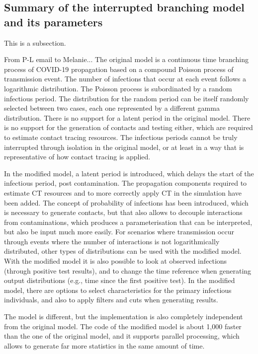 \documentclass[sr]{drdc-report}
\begin{document}
\subsection{Summary of the interrupted branching model and its parameters}
This is a subsection.

From P-L email to Melanie...
The original model is a continuous time branching process of COVID-19 propagation based on a compound Poisson process of transmission event. The number of infections that occur at each event follows a logarithmic distribution. The Poisson process is subordinated by a random infectious period. The distribution for the random period can be itself randomly selected between two cases, each one represented by a different gamma distribution. There is no support for a latent period in the original model. There is no support for the generation of contacts and testing either, which are required to estimate contact tracing resources. The infectious periods cannot be truly interrupted through isolation in the original model, or at least in a way that is representative of how contact tracing is applied.

In the modified model, a latent period is introduced, which delays the start of the infectious period, post contamination. The propagation components required to estimate CT resources and to more correctly apply CT in the simulation have been added. The concept of probability of infections has been introduced, which is necessary to generate contacts, but that also allows to decouple interactions from contaminations, which produces a parameterisation that can be interpreted, but also be input much more easily. For scenarios where transmission occur through events where the number of interactions is not logarithmically distributed, other types of distributions can be used with the modified model. With the modified model it is also possible to look at observed infections (through positive test results), and to change the time reference when generating output distributions (e.g., time since the first positive test). In the modified model, there are options to select characteristics for the primary infectious individuals, and also to apply filters and cuts when generating results.

The model is different, but the implementation is also completely independent from the original model. The code of the modified model is about 1,000 faster than the one of the original model, and it supports parallel processing, which allows to generate far more statistics in the same amount of time.
\end{document}
